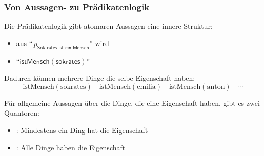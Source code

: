 \documentclass[aspectratio=1610,onlymath]{beamer}
\begin{document}
% 
% 
% 
% 



\begin{frame}\frametitle{Von Aussagen- zu Prädikatenlogik}

Die Prädikatenlogik gibt atomaren Aussagen eine innere Struktur:
\begin{itemize}
\item aus "`$\,p_{\textsf{Soktrates-ist-ein-Mensch}}\!$"' wird
\item "`$\textsf{istMensch}(\textsf{sokrates})$"'
\end{itemize}\bigskip\pause

Dadurch können mehrere Dinge die selbe Eigenschaft haben:
\[ \text{istMensch}(\text{sokrates})\quad \text{istMensch}(\text{emilia})\quad \text{istMensch}(\text{anton})\quad\cdots\]

\pause Für allgemeine Aussagen über die Dinge, die eine Eigenschaft haben, gibt es zwei
\alert{Quantoren:}
\begin{itemize}
\item {}: Mindestens ein Ding hat die Eigenschaft
\item {}: Alle Dinge haben die Eigenschaft
\end{itemize}

\end{frame}
\end{document}

